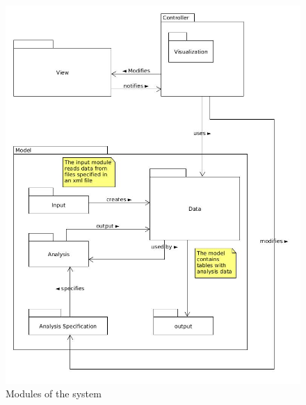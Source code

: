 \documentclass[a4paper]{article}
\begin{document}
\begin{figure}[h]
	\centering
    	\includegraphics[scale=0.5]{images/modules.jpg}
    \caption{Modules of the system}
	\label{fig:modules}
\end{figure}
\end{document}
